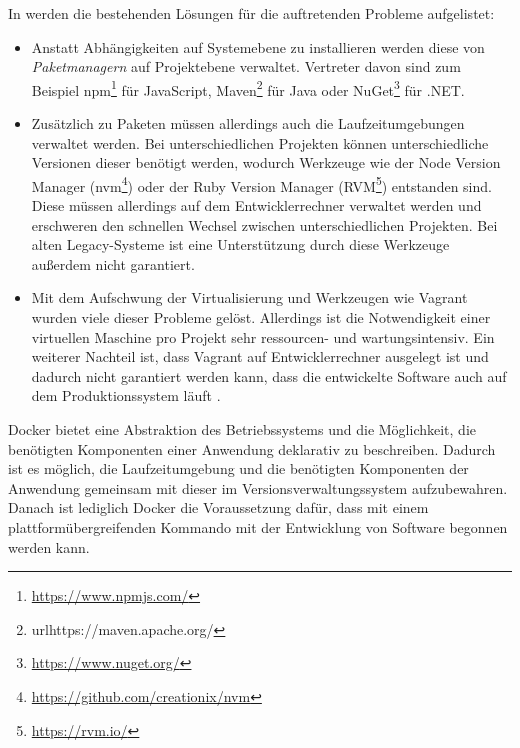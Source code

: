 In \autocite{smashing-local-devenv-docker:online} werden die bestehenden Lösungen für die auftretenden Probleme aufgelistet:
\begin{itemize}
    \item Anstatt Abhängigkeiten auf Systemebene zu installieren werden diese von \emph{Paketmanagern} auf Projektebene verwaltet.
    Vertreter davon sind zum Beispiel npm\footnote{\url{https://www.npmjs.com/}} für JavaScript, Maven\footnote{url{https://maven.apache.org/}} für Java oder NuGet\footnote{\url{https://www.nuget.org/}} für .NET.
    \item Zusätzlich zu Paketen müssen allerdings auch die Laufzeitumgebungen verwaltet werden.
    Bei unterschiedlichen Projekten können unterschiedliche Versionen dieser benötigt werden, wodurch Werkzeuge wie der Node Version Manager (nvm\footnote{\url{https://github.com/creationix/nvm}}) oder der Ruby Version Manager (RVM\footnote{\url{https://rvm.io/}}) entstanden sind.
    Diese müssen allerdings auf dem Entwicklerrechner verwaltet werden und erschweren den schnellen Wechsel zwischen unterschiedlichen Projekten.
    Bei alten Legacy-Systeme ist eine Unterstützung durch diese Werkzeuge außerdem nicht garantiert.
    \item Mit dem Aufschwung der Virtualisierung und Werkzeugen wie Vagrant wurden viele dieser Probleme gelöst.
    Allerdings ist die Notwendigkeit einer virtuellen Maschine pro Projekt sehr ressourcen- und wartungsintensiv.
    Ein weiterer Nachteil ist, dass Vagrant auf Entwicklerrechner ausgelegt ist und dadurch nicht garantiert werden kann, dass die entwickelte Software auch auf dem Produktionssystem läuft \autocite{laradock-docs:online}.
\end{itemize}
Docker bietet eine Abstraktion des Betriebssystems und die Möglichkeit, die benötigten Komponenten einer Anwendung deklarativ zu beschreiben.
Dadurch ist es möglich, die Laufzeitumgebung und die benötigten Komponenten der Anwendung gemeinsam mit dieser im Versionsverwaltungssystem aufzubewahren.
Danach ist lediglich Docker die Voraussetzung dafür, dass mit einem plattformübergreifenden Kommando mit der Entwicklung von Software begonnen werden kann.

